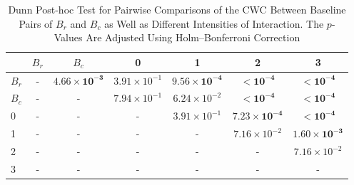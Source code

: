 \begin{table*}[!t]
\caption{Dunn Post-hoc Test for Pairwise Comparisons of the CWC Between Baseline Pairs of $B_r$ and $B_c$ as Well as Different Intensities of Interaction. The $p$-Values Are Adjusted Using Holm--Bonferroni Correction\label{tab:dunn_coherence}}
\centering
\begin{tabular}{lcccccc}
\toprule
 & $B_r$ & $B_c$ & 0 & 1 & 2 & 3 \\
\midrule
$B_r$ & - & $\mathbf{4.66 \times 10^{-3}}$ & $3.91 \times 10^{-1}$ & $\mathbf{9.56 \times 10^{-4}}$ & $\mathbf{< 10^{-4}}$ & $\mathbf{< 10^{-4}}$ \\
$B_c$ & - & - & $7.94 \times 10^{-1}$ & $6.24 \times 10^{-2}$ & $\mathbf{< 10^{-4}}$ & $\mathbf{< 10^{-4}}$ \\
0 & - & - & - & $3.91 \times 10^{-1}$ & $\mathbf{7.23 \times 10^{-4}}$ & $\mathbf{< 10^{-4}}$ \\
1 & - & - & - & - & $7.16 \times 10^{-2}$ & $\mathbf{1.60 \times 10^{-3}}$ \\
2 & - & - & - & - & - & $7.16 \times 10^{-2}$ \\
3 & - & - & - & - & - & - \\
\bottomrule
\end{tabular}
\end{table*}
